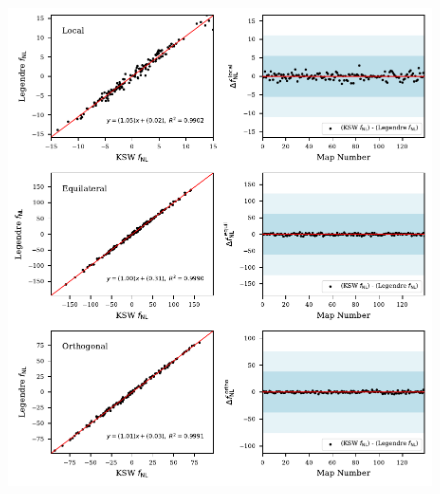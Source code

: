 \documentclass[a4paper,12pt,times,custombib,print,index]{Classes/PhDThesisPSnPDF} %
\providecommand{\DIFaddbeginFL}{} %
\providecommand{\DIFdelbeginFL}{} %
\providecommand{\DIFdelendFL}{} %
\newcommand{\DIFscaledelfig}{0.5}
\newlength{\DIFdelgraphicswidth} %
\newlength{\DIFdelgraphicsheight} %
\newcommand{\DIFaddincludegraphics}[2][]{{\color{blue}\fbox{\DIFOincludegraphics[#1]{#2}}}} %
\newcommand{\DIFdelincludegraphics}[2][]{%
\sbox{\DIFdelgraphicsbox}{\DIFOincludegraphics[#1]{#2}}%
\settoboxwidth{\DIFdelgraphicswidth}{\DIFdelgraphicsbox} %
\settoboxtotalheight{\DIFdelgraphicsheight}{\DIFdelgraphicsbox} %
\scalebox{\DIFscaledelfig}{%
\parbox[b]{\DIFdelgraphicswidth}{\usebox{\DIFdelgraphicsbox}\\[-\baselineskip] \rule{\DIFdelgraphicswidth}{0em}}\llap{\resizebox{\DIFdelgraphicswidth}{\DIFdelgraphicsheight}{%
\setlength{\unitlength}{\DIFdelgraphicswidth}%
\begin{picture}(1,1)%
\thicklines\linethickness{2pt} %
{\color[rgb]{1,0,0}\put(0,0){\framebox(1,1){}}}%
{\color[rgb]{1,0,0}\put(0,0){\line( 1,1){1}}}%
{\color[rgb]{1,0,0}\put(0,1){\line(1,-1){1}}}%
\end{picture}%
}\hspace*{3pt}}} %
} %
\DeclareRobustCommand{\DIFaddbeginFL}{\DIFOaddbeginFL \let\includegraphics\DIFaddincludegraphics} %
\DeclareRobustCommand{\DIFdelbeginFL}{\DIFOdelbeginFL \let\includegraphics\DIFdelincludegraphics} %
\DeclareRobustCommand{\DIFdelendFL}{\DIFOaddendFL \let\includegraphics\DIFOincludegraphics} %
\begin{document}
\begin{figure}[htbp!] 
	\centering 
	\DIFdelbeginFL %
\DIFdelendFL \DIFaddbeginFL \includegraphics{map_by_map_Legendre_KSW.pdf}

\end{figure}
\end{document}
